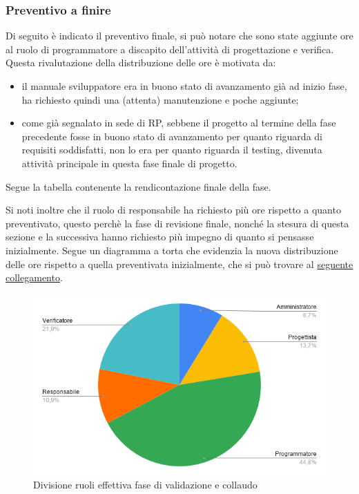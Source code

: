     \subsubsection{Preventivo a finire}
        Di seguito è indicato il preventivo finale, si può notare che sono state aggiunte ore al ruolo di programmatore a discapito dell'attività di progettazione e verifica. Questa rivalutazione della distribuzione delle ore è motivata da:
        \begin{itemize}
            \item il manuale sviluppatore era in buono stato di avanzamento già ad inizio fase, ha richiesto quindi una (attenta) manutenzione e poche aggiunte;
            \item come già segnalato in sede di RP, sebbene il progetto al termine della fase precedente fosse in buono stato di avanzamento per quanto riguarda di requisiti soddisfatti, non lo era per quanto riguarda il testing, divenuta attività principale in questa fase finale di progetto.
        \end{itemize}
        Segue la tabella contenente la rendicontazione finale della fase.
        \def\salarycontent{
            {Amministratore,16,20,320},
            {Analista,      0,25,0},
            {Progettista,   25,22,550},
            {Programmatore, 82,15,1230},
            {Responsabile,  20,30,600},
            {Verificatore,  40,15,600},
            {Totale,        183,127,3300},
        }
        
        Si noti inoltre che il ruolo di responsabile ha richiesto più ore rispetto a quanto preventivato, questo perchè la fase di revisione finale, nonché la stesura di questa sezione e la successiva hanno richiesto più impegno di quanto si pensasse inizialmente.
        Segue un diagramma a torta che evidenzia la nuova distribuzione delle ore rispetto a quella preventivata inizialmente, che si può trovare al \hyperref[image:verifica_ruoli]{seguente collegamento}. 
        \begin{figure}[H]
            \centering
            \includegraphics[width=\textwidth]{source/img/verifica_ruoli_modificato.png}
            \caption{Divisione ruoli effettiva fase di validazione e collaudo}
        \end{figure}
